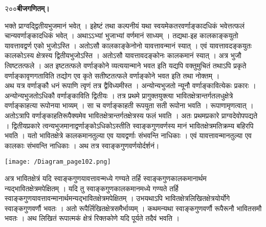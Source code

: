 \documentclass[11pt, openany]{book}
\begin{document}
\onehalfspacing
२००\hspace{2in}\textbf{बीजगणितम्।} 

\vspace{5mm}

\begin{sloppypar}
\hangindent=0.2in भक्ते प्राग्वद्द्वितीयभुजमानं भवेत् । इहेष्टं तथा कल्पनीयं यथा स्वयमेकतरवर्णाङ्कादधिकं भवेत्तत्फलं चान्यवर्णाङ्कादधिकं भवेत् । अथाऽऽभ्यां भुजाभ्यां वर्णमानं साध्यम् । तद्यथा-इह कालकाङ्कयुतो यावत्तावद्वर्ण एको भुजोऽस्ति । अतोऽसौ कालकाङ्केनोनो यावत्तावन्मानं स्यात् । एवं यावत्तावदङ्कयुतः कालकोऽस्य क्षेत्रस्य द्वितीयभुजोऽस्ति ।  अतोऽसौ यावत्तावदङ्कोनः कालकमानं स्यात् । अत्र भुजौ त्विष्टतत्फले । अत इष्टतत्फले वर्णाङ्कोने व्यत्ययान्माने भवत इति यद्यपि वक्तुमुचितं तथाऽपि प्रकृते वर्णाङ्कावृणगताविति तद्योग एव कृते सतीष्टतत्फले वर्णाङ्कोने भवत इति तथा नोक्तम् ।\\

\hangindent=0.2in \hspace{0.2in}अथ यत्र वर्णाङ्कौ धनं रूपाणि त्वृणं तत्र द्वैविध्यमीस्त । अन्योन्यभुजतो न्यूनौ वर्णाङ्कावित्येकः प्रकारः । अन्योन्यभुजतोऽधिकौ वर्णाङ्काविति द्वितीयः । तत्र प्रथमे  प्रागुक्तयुक्त्या भावितक्षेत्रान्तर्गतलधुक्षेत्रे वर्णाङ्काहत्या रूपोनया भाव्यम् । सा च वर्णाङ्काहती रूपयुता सती रूपोना भवति । रूपाणामृणत्वात् । अतोऽत्रापि वर्णाङ्काहतिरूपैक्यमेव भावितक्षेत्रान्तर्गतक्षेत्रस्य फलं भवति । अतः प्रथमप्रकारे प्राग्वदेवोपपद्यते । द्वितीयप्रकारे त्वन्यभुजमानाद्वर्णाङ्कोऽधिकोऽस्तीति स्वाङ्कगुणवर्णस्य मानं भावितक्षेत्रमतिक्रम्य बहिरपि भवति । यतो भावितक्षेत्रे कालकमानतुल्या एव यावद्वर्णाः संभवन्ति नाधिकाः । एवं यावत्तावन्मानतुल्या एव कालकाः संभवन्ति नाधिकाः । अथ तत्र स्वाङ्कगुणवर्णयोर्दर्शनं।\\

\begin{center}
\hspace{0.2in}\texttt{[image: /Diagram\_page102.png]}
\end{center}

\hangindent=0.2in \hspace{0.2in}अत्र भावितक्षेत्रं यदि स्वाङ्कगुणयावत्तावन्मध्ये गण्यते तर्हि स्वाङ्कगुणकालकमानार्थम न्यद्भावितक्षेत्रमपेक्षितम् । यदि तु स्वाङ्कगुणकालकमानमध्ये गण्यते तर्हि स्वाङ्कगुणयावत्तावन्मानार्थमन्यद्भावितक्षेत्रमपेक्षितम् । उभयथाऽपि भावितक्षेत्रलिखितक्षेत्रयोर्योगे स्वाङ्कगुणवर्णौ भवतः । अतो रूपैर्लिखितक्षेत्रसमैर्भाव्यम् । कथमन्यथा स्वाङ्कगुणवर्णौ रूपैरूनौ भावितसमौ भवतः । अथ लिखितं रूपात्मकं क्षेत्रं रिक्तकोणे यदि पूर्यते तदैवं भवति ।
\end{sloppypar}
\thispagestyle{empty}
\newpage
\end{document}
